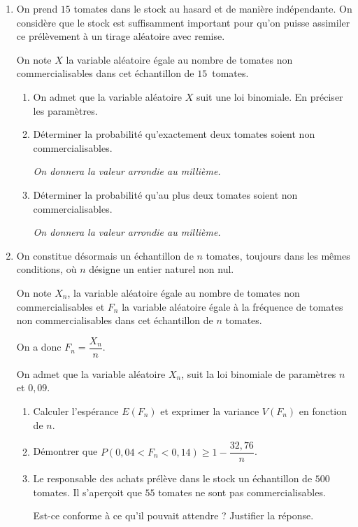 \documentclass[10pt]{article}
\begin{document}
\begin{enumerate}
\item On prend $15$ tomates dans le stock au hasard et de manière indépendante. On considère que le stock est suffisamment important pour qu'on puisse assimiler ce prélèvement à un tirage aléatoire avec remise.

On note $X$ la variable aléatoire égale au nombre de tomates non commercialisables dans cet échantillon de $15$~tomates.
	\begin{enumerate}
		\item On admet que la variable aléatoire $X$ suit une loi binomiale. En préciser les paramètres.
		\item Déterminer la probabilité qu'exactement deux tomates soient non commercialisables.

\emph{On donnera la valeur arrondie au millième.}
		\item Déterminer la probabilité qu'au plus deux tomates soient non commercialisables.

\emph{On donnera la valeur arrondie au millième.}
	\end{enumerate}
\item On constitue désormais un échantillon de $n$ tomates, toujours dans les mêmes conditions, où $n$ désigne un entier naturel non nul.

On note $X_n$, la variable aléatoire égale au nombre de tomates non commercialisables et $F_n$ la variable aléatoire égale à la fréquence de tomates non commercialisables dans cet échantillon de $n$ tomates.

On a donc $F_n = \dfrac{X_n}{n}$.

On admet que la variable aléatoire $X_n$, suit la loi binomiale de paramètres $n$ et $0,09$.
	\begin{enumerate}
		\item Calculer l'espérance $E(F_n)$ et exprimer la variance $V(F_n)$ en fonction de $n$.
		\item Démontrer que $P(0,04 < F_n < 0,14) \geqslant 1 - \dfrac{32,76}{n}$.
		\item Le responsable des achats prélève dans le stock un échantillon de $500$ tomates. Il s'aperçoit que $55$ tomates ne sont pas commercialisables. 

Est-ce conforme à ce qu'il pouvait attendre ? Justifier la réponse.
	\end{enumerate}
\end{enumerate}

\medskip
\end{document}
